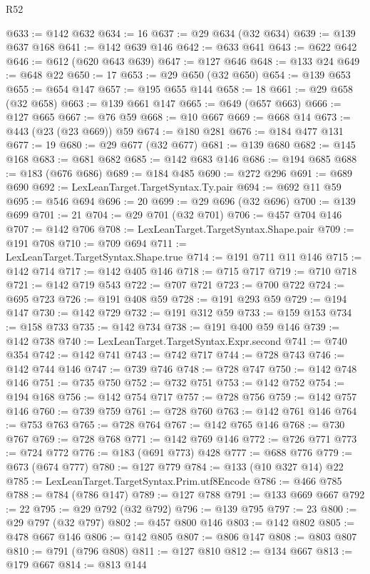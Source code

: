 \begin{lexlean}{R52}
\begin{coremodule}
@633 := @142 @632
@634 := 16
@637 := @29 @634 (@32 @634)
@639 := @139 @637 @168
@641 := @142 @639 @146
@642 := @633 @641
@643 := @622 @642
@646 := @612 (@620 @643 @639)
@647 := @127 @646
@648 := @133 @24
@649 := @648 @22
@650 := 17
@653 := @29 @650 (@32 @650)
@654 := @139 @653
@655 := @654 @147
@657 := @195 @655 @144
@658 := 18
@661 := @29 @658 (@32 @658)
@663 := @139 @661 @147
@665 := @649 (@657 @663)
@666 := @127 @665
@667 := @76 @59
@668 := @10 @667
@669 := @668 @14
@673 := @443 (@23 (@23 @669)) @59
@674 := @180 @281
@676 := @184 @477 @131
@677 := 19
@680 := @29 @677 (@32 @677)
@681 := @139 @680
@682 := @145 @168
@683 := @681 @682
@685 := @142 @683 @146
@686 := @194 @685
@688 := @183 (@676 @686)
@689 := @184 @485
@690 := @272 @296
@691 := @689 @690
@692 := LexLeanTarget.TargetSyntax.Ty.pair
@694 := @692 @11 @59
@695 := @546 @694
@696 := 20
@699 := @29 @696 (@32 @696)
@700 := @139 @699
@701 := 21
@704 := @29 @701 (@32 @701)
@706 := @457 @704 @146
@707 := @142 @706
@708 := LexLeanTarget.TargetSyntax.Shape.pair
@709 := @191 @708
@710 := @709 @694
@711 := LexLeanTarget.TargetSyntax.Shape.true
@714 := @191 @711 @11 @146
@715 := @142 @714
@717 := @142 @405 @146
@718 := @715 @717
@719 := @710 @718
@721 := @142 @719 @543
@722 := @707 @721
@723 := @700 @722
@724 := @695 @723
@726 := @191 @408 @59
@728 := @191 @293 @59
@729 := @194 @147
@730 := @142 @729
@732 := @191 @312 @59
@733 := @159 @153
@734 := @158 @733
@735 := @142 @734
@738 := @191 @400 @59 @146
@739 := @142 @738
@740 := LexLeanTarget.TargetSyntax.Expr.second
@741 := @740 @354
@742 := @142 @741
@743 := @742 @717
@744 := @728 @743
@746 := @142 @744 @146
@747 := @739 @746
@748 := @728 @747
@750 := @142 @748 @146
@751 := @735 @750
@752 := @732 @751
@753 := @142 @752
@754 := @194 @168
@756 := @142 @754 @717
@757 := @728 @756
@759 := @142 @757 @146
@760 := @739 @759
@761 := @728 @760
@763 := @142 @761 @146
@764 := @753 @763
@765 := @728 @764
@767 := @142 @765 @146
@768 := @730 @767
@769 := @728 @768
@771 := @142 @769 @146
@772 := @726 @771
@773 := @724 @772
@776 := @183 (@691 @773) @428
@777 := @688 @776
@779 := @673 (@674 @777)
@780 := @127 @779
@784 := @133 (@10 @327 @14) @22
@785 := LexLeanTarget.TargetSyntax.Prim.utf8Encode
@786 := @466 @785
@788 := @784 (@786 @147)
@789 := @127 @788
@791 := @133 @669 @667
@792 := 22
@795 := @29 @792 (@32 @792)
@796 := @139 @795
@797 := 23
@800 := @29 @797 (@32 @797)
@802 := @457 @800 @146
@803 := @142 @802
@805 := @478 @667 @146
@806 := @142 @805
@807 := @806 @147
@808 := @803 @807
@810 := @791 (@796 @808)
@811 := @127 @810
@812 := @134 @667
@813 := @179 @667
@814 := @813 @144

\end{coremodule}
\end{lexlean}

